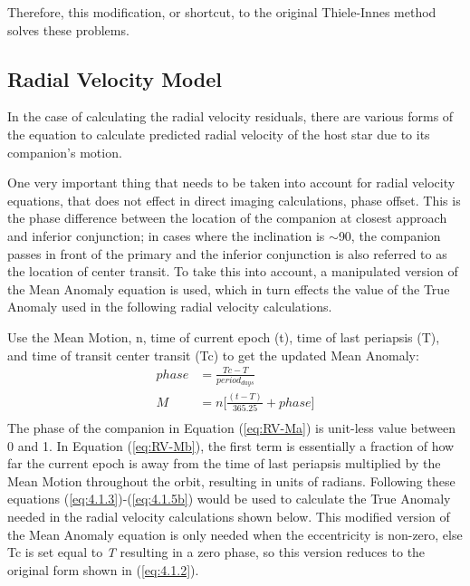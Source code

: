 \documentclass[12pt,preprint]{aastex}
\begin{document}
Therefore, this modification, or shortcut, to the original Thiele-Innes method solves these problems.

\clearpage

\subsection{Radial Velocity Model}\label{sec:RV-OrbModels}

In the case of calculating the radial velocity residuals, there are various forms of the equation to calculate predicted radial velocity of the host star due to its companion's motion.

One very important thing that needs to be taken into account for radial velocity equations, that does not effect in direct imaging calculations, phase offset.  This is the phase difference between the location of the companion at closest approach and inferior conjunction; in cases where the inclination is $\sim$90, the companion passes in front of the primary and the inferior conjunction is also referred to as the location of center transit.  To take this into account, a manipulated version of the Mean Anomaly equation is used, which in turn effects the value of the True Anomaly used in the following radial velocity calculations.

Use the Mean Motion, n, time of current epoch (t), time of last periapsis (T), and time of transit center transit (Tc) to get the updated Mean Anomaly:
\begin{subequations}\label{eq:RV-Ma}
\begin{align}
phase& = \frac{Tc-T}{period_{days}} \\
\label{eq:RV-Mb}
M& = n \bigg[ \frac{(t-T)}{365.25} +phase \bigg]\\
\end{align}
\end{subequations}
The phase of the companion in Equation (\ref{eq:RV-Ma}) is unit-less value between 0 and 1.  In Equation (\ref{eq:RV-Mb}), the first term is essentially a fraction of how far the current epoch is away from the time of last periapsis multiplied by the Mean Motion throughout the orbit, resulting in units of radians.  Following these equations (\ref{eq:4.1.3})-(\ref{eq:4.1.5b}) would be used to calculate the True Anomaly needed in the radial velocity calculations shown below.  This modified version of the Mean Anomaly equation is only needed when the eccentricity is non-zero, else Tc is set equal to {\it T} resulting in a zero phase, so this version reduces to the original form shown in (\ref{eq:4.1.2}).
\end{document}
